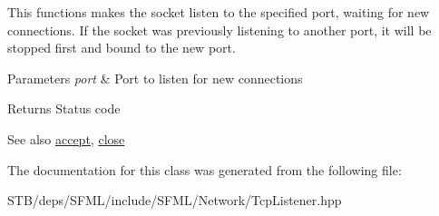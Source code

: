 This functions makes the socket listen to the specified port, waiting for new connections. If the socket was previously listening to another port, it will be stopped first and bound to the new port.


\begin{DoxyParams}{Parameters}
{\em port} & Port to listen for new connections\\
\hline
\end{DoxyParams}
\begin{DoxyReturn}{Returns}
Status code
\end{DoxyReturn}
\begin{DoxySeeAlso}{See also}
\hyperlink{classsf_1_1_tcp_listener_ae2c83ce5a64d50b68180c46bef0a7346}{accept}, \hyperlink{classsf_1_1_tcp_listener_a3a00a850506bd0f9f48867a0fe59556b}{close} 
\end{DoxySeeAlso}


The documentation for this class was generated from the following file\+:\begin{DoxyCompactItemize}
\item 
S\+T\+B/deps/\+S\+F\+M\+L/include/\+S\+F\+M\+L/\+Network/Tcp\+Listener.\+hpp\end{DoxyCompactItemize}
